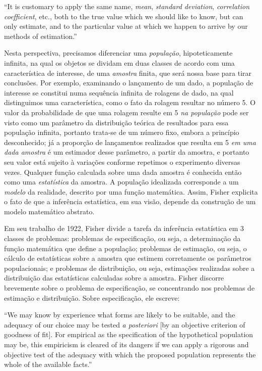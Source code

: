 ``It is customary to apply the same name, {\em mean}, {\em standard deviation}, {\em correlation coefficient}, etc., both 
to the true value which we should like to know, but can only estimate, and to the particular value at which we happen 
to arrive by our methods of estimation.''\citep{Fisher1922}

Nesta perspectiva, precisamos diferenciar uma {\em população}, hipoteticamente infinita, na qual os objetos se dividam em duas
classes de acordo com uma característica de interesse, de uma {\em amostra} finita, que será nossa base para tirar conclusões.
Por exemplo, examinando o lançamento de um dado, a população de interesse se constitui numa sequência infinita de rolagens
de dado, na qual distinguimos uma característica, como o fato da rolagem resultar no número 5. O valor da probabilidade de que
uma rolagem resulte em 5 {\em na população} pode ser visto como um parâmetro da distribuição teórica de resultados para essa
população infinita, portanto trata-se de um número fixo, embora a princípio desconhecido; 
já a proporção de lançamentos realizados que resulta em 5 {\em em uma dada amostra} é um estimador desse parâmetro,
a partir da amostra, e portanto seu valor está sujeito à variações conforme repetimos o experimento diversas vezes.
Qualquer função calculada sobre uma dada amostra é conhecida então como uma {\em estatística} da amostra.
A população idealizada corresponde a um {\em modelo} da realidade, descrito por uma função matemática.
Assim, Fisher explicita o fato de que a inferência estatística, em sua visão, depende da construção de um modelo matemático
abstrato.

Em seu trabalho de 1922, Fisher divide a tarefa da inferência estatística em 3 classes de 
problemas: problemas de especificação, ou seja, a determinação da função
matemática que define a população; problemas de estimação, ou seja, o cálculo de estatísticas sobre a amostra que estimem 
corretamente os parâmetros populacionais; e problemas de distribuição, ou seja, estimações realizadas sobre a distribuição
das estatísticas calculadas sobre a amostra. Fisher discorre brevemente sobre o problema de especificação,
se concentrando nos problemas de estimação e distribuição. Sobre especificação, ele escreve:

``We may know by experience what forms are likely to be suitable, and the adequacy of our choice may be
tested {\em a posteriori} [by an objective criterion of goodness of fit].
For empirical as the specification of the hypothetical population may be, this empiricism is cleared of its dangers if
we can apply a rigorous and objective test of the adequacy with which the proposed population represents the whole of
the available facts.''\citep{Fisher1922}

